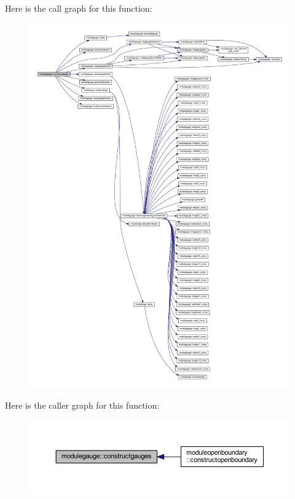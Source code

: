 Here is the call graph for this function\+:\nopagebreak
\begin{figure}[H]
\begin{center}
\leavevmode
\includegraphics[width=350pt]{namespacemodulegauge_a5f441d56f4c693dc4323df1e0d702ea6_cgraph}
\end{center}
\end{figure}
Here is the caller graph for this function\+:\nopagebreak
\begin{figure}[H]
\begin{center}
\leavevmode
\includegraphics[width=350pt]{namespacemodulegauge_a5f441d56f4c693dc4323df1e0d702ea6_icgraph}
\end{center}
\end{figure}
\mbox{\label{namespacemodulegauge_a986286ef5f7c779896aa9d9797f840cd}} 
